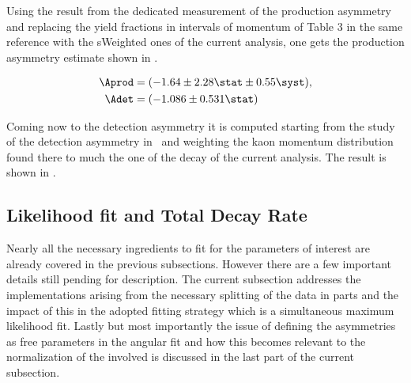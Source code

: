 Using the result from the dedicated \lhcb measurement of the production asymmetry ~\cite{LHCb-PAPER-2014-042}
and replacing the yield fractions in intervals of \Bs momentum of Table 3 in the same reference with the sWeighted \BsJpsiKst ones of the current analysis,
one gets the production asymmetry estimate shown in .

\begin{subequations}
  \label{exp_assym}
  \begin{align}
    \centering
    \Aprod &= (-1.64 \pm 2.28 \stat \pm 0.55 \syst), \label{prod_assym} \\
    \Adet  &= (-1.086 \pm 0.531 \stat) \label{det_assym}
  \end{align}
\end{subequations}

\noindent Coming now to the detection asymmetry it is computed starting from the \lhcb study of the detection asymmetry
in~\cite{LHCb-PAPER-2014-013} and weighting the kaon momentum distribution found there to much the one of the \BsJpsiKst
decay of the current analysis. The result is shown in .

\subsection{Likelihood fit and Total Decay Rate}
\label{Total_Decay_Rate}

Nearly all the necessary ingredients to fit for the parameters of interest are already covered in the previous subsections.
However there are a few important details still pending for description. The current subsection addresses the
implementations arising from the necessary splitting of the data in parts and the impact of this in the adopted
fitting strategy which is a simultaneous maximum likelihood fit. Lastly but most importantly the issue of defining the \ACP
asymmetries as free parameters in the angular fit and how this becomes relevant to the normalization of the \pdfs
involved is discussed in the last part of the current subsection.

